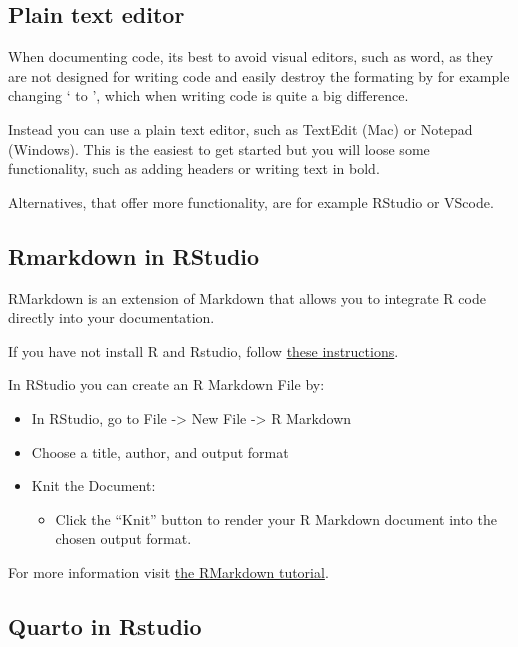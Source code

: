\documentclass[
  letterpaper,
  DIV=11,
  numbers=noendperiod]{scrreprt}
\providecommand{\tightlist}{%
  \setlength{\itemsep}{0pt}\setlength{\parskip}{0pt}}\usepackage{longtable,booktabs,array}
\begin{document}
\subsection{Plain text editor}\label{plain-text-editor}

When documenting code, its best to avoid visual editors, such as word,
as they are not designed for writing code and easily destroy the
formating by for example changing ` to ', which when writing code is
quite a big difference.

Instead you can use a plain text editor, such as TextEdit (Mac) or
Notepad (Windows). This is the easiest to get started but you will loose
some functionality, such as adding headers or writing text in bold.

Alternatives, that offer more functionality, are for example RStudio or
VScode.

\subsection{Rmarkdown in RStudio}\label{rmarkdown-in-rstudio}

RMarkdown is an extension of Markdown that allows you to integrate R
code directly into your documentation.

If you have not install R and Rstudio, follow
\href{https://rstudio-education.github.io/hopr/starting.html}{these
instructions}.

In RStudio you can create an R Markdown File by:

\begin{itemize}
\tightlist
\item
  In RStudio, go to File -\textgreater{} New File -\textgreater{} R
  Markdown
\item
  Choose a title, author, and output format
\item
  Knit the Document:

  \begin{itemize}
  \tightlist
  \item
    Click the ``Knit'' button to render your R Markdown document into
    the chosen output format.
  \end{itemize}
\end{itemize}

For more information visit
\href{https://rmarkdown.rstudio.com/lesson-1.html}{the RMarkdown
tutorial}.

\subsection{Quarto in Rstudio}\label{quarto-in-rstudio}
\end{document}

